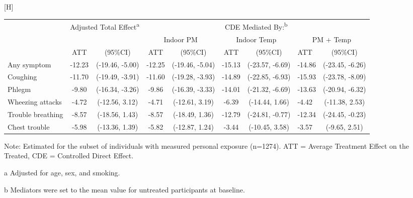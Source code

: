 \documentclass[
  letterpaper,
  DIV=11,
  numbers=noendperiod]{scrartcl}
\makeatletter
\renewenvironment{table}%
   {\renewcommand\familydefault\sfdefault
    \@float{table}}
   {\end@float}
\makeatother
\begin{document}
\hypertarget{tbl-resp-med}{}
\begin{table}[H]
\caption{\label{tbl-resp-med}Controlled direct effects for the CBHP policy on self-reported
respiratory outcomes }\tabularnewline

\centering\begingroup\fontsize{9}{11}\selectfont

\begin{threeparttable}
\begin{tabular}{lcccccclc}
\toprule
\multicolumn{1}{c}{ } & \multicolumn{2}{c}{Adjusted Total Effect\textsuperscript{a}} & \multicolumn{6}{c}{CDE Mediated By:\textsuperscript{b}} \\
\cmidrule(l{3pt}r{3pt}){2-3} \cmidrule(l{3pt}r{3pt}){4-9}
\multicolumn{3}{c}{ } & \multicolumn{2}{c}{Indoor PM} & \multicolumn{2}{c}{Indoor Temp} & \multicolumn{2}{c}{PM + Temp} \\
\cmidrule(l{3pt}r{3pt}){4-5} \cmidrule(l{3pt}r{3pt}){6-7} \cmidrule(l{3pt}r{3pt}){8-9}
 & ATT & (95\%CI) & ATT & (95\%CI) & ATT & (95\%CI) & ATT & (95\%CI)\\
\midrule
Any symptom & -12.23 & (-19.46, -5.00) & -12.25 & (-19.46, -5.04) & -15.13 & (-23.57, -6.69) & -14.86 & (-23.45, -6.26)\\
Coughing & -11.70 & (-19.49, -3.91) & -11.60 & (-19.28, -3.93) & -14.89 & (-22.85, -6.93) & -15.93 & (-23.78, -8.09)\\
Phlegm & -9.80 & (-16.34, -3.26) & -9.86 & (-16.39, -3.33) & -14.01 & (-21.32, -6.69) & -13.63 & (-20.94, -6.32)\\
Wheezing attacks & -4.72 & (-12.56, 3.12) & -4.71 & (-12.61, 3.19) & -6.39 & (-14.44, 1.66) & -4.42 & (-11.38, 2.53)\\
Trouble breathing & -8.57 & (-18.56, 1.43) & -8.57 & (-18.49, 1.36) & -12.79 & (-24.81, -0.77) & -12.34 & (-24.45, -0.23)\\
Chest trouble & -5.98 & (-13.36, 1.39) & -5.82 & (-12.87, 1.24) & -3.44 & (-10.45, 3.58) & -3.57 & (-9.65, 2.51)\\
\bottomrule
\end{tabular}
\begin{tablenotes}
\item \small{Note: Estimated for the subset of individuals with measured personal exposure (n=1274). ATT = Average Treatment Effect on the Treated, CDE = Controlled Direct Effect.}
\item[a] \small{Adjusted for age, sex, and smoking.}
\item[b] \small{Mediators were set to the mean value for untreated participants at baseline.}
\end{tablenotes}
\end{threeparttable}
\endgroup{}
\end{table}
\end{document}
